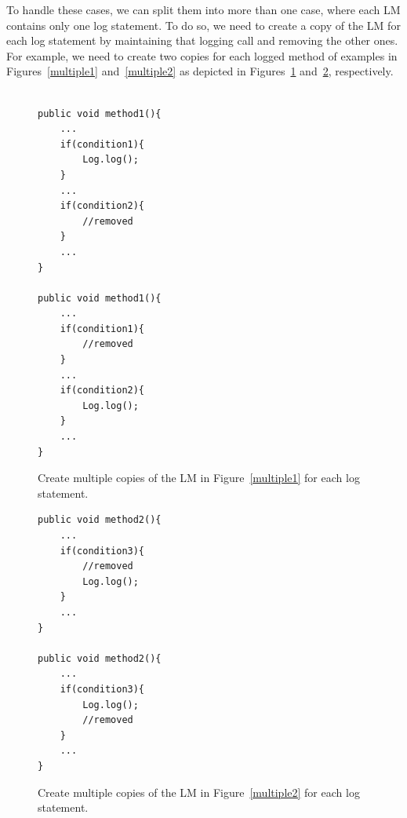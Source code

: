 To handle these cases, we can split them into more than one case, where each LM contains only one log statement. To do so, we need to create a copy of the LM for each log statement by maintaining that logging call and removing the other ones. For example, we need to create two copies for each logged  method of examples in Figures~\ref{multiple1} and~\ref{multiple2} as depicted in Figures~\ref{multiple1-one} and~\ref{multiple2-one}, respectively.


\begin{figure}[H]
\def\baselinestretch{1}
\begin{lstlisting}

public void method1(){
	...
	if(condition1){
		Log.log();
	}
	...
	if(condition2){
		//removed
	}
	...
}

public void method1(){
	...
	if(condition1){
		//removed
	}
	...
	if(condition2){
		Log.log();
	}
	...
}

\end{lstlisting}
\caption{Create multiple copies of the LM in Figure~\ref{multiple1} for each log statement.\label{multiple1-one}}
\end{figure}



\begin{figure}[H]
\def\baselinestretch{1}
\begin{lstlisting}
public void method2(){
	...
	if(condition3){
		//removed
		Log.log();
	}
	...
}

public void method2(){
	...
	if(condition3){
		Log.log();
		//removed
	}
	...
}

\end{lstlisting}
\caption{Create multiple copies of the LM in Figure~\ref{multiple2} for each log statement.\label{multiple2-one}}
\end{figure}

